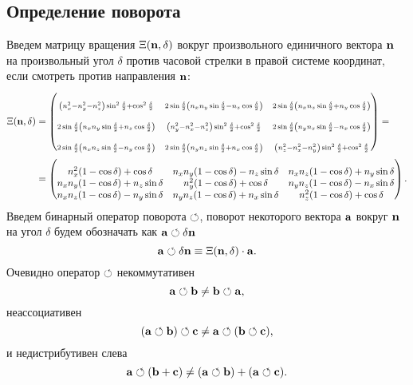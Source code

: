 \subsection{Определение поворота}
Введем матрицу вращения $\Xi({\bf n},\delta)$ вокруг произвольного
единичного вектора ${\bf n}$ на произвольный угол $\delta$
против часовой стрелки в правой системе координат, если смотреть против направления ${\bf n}$:
\begin{align}
\Xi(\n,\delta) &= 
\left( \begin{matrix}
\mstyle\rule{0pt}{18pt}
\mstyle
\left(n_x^2-n_y^2-n_z^2\right)\sin^2\frac\delta 2+\cos^2\frac\delta 2 &
\mstyle
2\sin\frac\delta 2\left(n_xn_y\sin\frac\delta 2-n_z\cos\frac\delta 2\right) &
\mstyle
2\sin\frac\delta 2\left(n_xn_z\sin\frac\delta 2+n_y\cos\frac\delta 2\right) \\
\mstyle\rule{0pt}{18pt}
2\sin\frac\delta 2\left(n_xn_y\sin\frac\delta 2+n_z\cos\frac\delta 2\right) &
\mstyle
\left(n_y^2-n_x^2-n_z^2\right)\sin^2\frac\delta 2+\cos^2\frac\delta 2 &
\mstyle
2\sin\frac\delta 2\left(n_yn_z\sin\frac\delta 2-n_x\cos\frac\delta 2\right) \\
\mstyle\rule{0pt}{18pt}
2\sin\frac\delta 2\left(n_xn_z\sin\frac\delta 2-n_y\cos\frac\delta 2\right) &
\mstyle
2\sin\frac\delta 2\left(n_yn_z\sin\frac\delta 2+n_x\cos\frac\delta 2\right) &
\mstyle
\left(n_z^2-n_x^2-n_y^2\right)\sin^2\frac\delta 2+\cos^2\frac\delta 2 
\end{matrix} \right) = \notag \\ &=
\left( \begin{matrix}
\rule{0pt}{18pt}
n_x^2(1-\cos\delta)+ \cos\delta         & n_x n_y (1-\cos\delta) - n_z \sin\delta  &  n_x n_z (1-\cos\delta) + n_y \sin\delta \\
n_x n_y (1-\cos\delta) + n_z \sin\delta &  n_y^2(1-\cos\delta)+ \cos\delta         &  n_y n_z (1-\cos\delta) - n_x \sin\delta \\
n_x n_z (1-\cos\delta) - n_y \sin\delta &  n_y n_z (1-\cos\delta) + n_x \sin\delta & n_z^2(1-\cos\delta)+ \cos\delta 
\end{matrix} \right).
\notag
\end{align}
Введем бинарный оператор поворота $\circlearrowleft$, поворот некоторого вектора ${\bf a}$ вокруг ${\bf n}$ на угол $\delta$ будем обозначать как ${\bf a} \circlearrowleft \delta{\bf n}$
$$
{\bf a} \circlearrowleft \delta{\bf n} \equiv \Xi({\bf n}, \delta) \cdot {\bf a}.
$$
Очевидно оператор $\circlearrowleft$ некоммутативен 
$$
{\bf a}\circlearrowleft{\bf b} \neq {\bf b}\circlearrowleft {\bf a},
$$
неассоциативен 
$$
({\bf a}\circlearrowleft{\bf b}) \circlearrowleft \mathbf{c} \neq {\bf a}\circlearrowleft ({\bf b} \circlearrowleft \mathbf{c}),
$$
и недистрибутивен слева 
$$
{\bf a}\circlearrowleft({\bf b} + \mathbf{c}) \neq ({\bf a}\circlearrowleft {\bf b} ) + ({\bf a} \circlearrowleft \mathbf{c}).
$$
